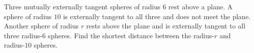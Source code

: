 Three mutually externally tangent spheres of radius $6$ rest above a plane. A sphere of radius $10$ is externally tangent to all three and does not meet the plane. Another sphere of radius $r$ rests above the plane and is externally tangent to all three radius-$6$ spheres. Find the shortest distance between the radius-$r$ and radius-$10$ spheres.
